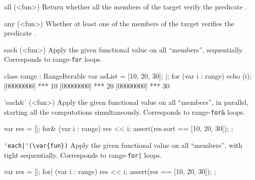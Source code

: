 \begin{urbiscriptapi}
\item[all](<fun>)
  Return whether all the members of the target verify the predicate
  .


\item[any](<fun>)
  Whether at least one of the members of the target verifies the
  predicate .


\item[each](<fun>)%
  Apply the given functional value  on all ``members'',
  sequentially.  Corresponds to range-\lstinline|for| loops.
\begin{urbiscript}[firstnumber=1]
class range : RangeIterable
{
  var asList = [10, 20, 30];
}|;
for (var i : range)
  echo (i);
[00000000] *** 10
[00000000] *** 20
[00000000] *** 30
\end{urbiscript}

\item['each&'](<fun>)%
  Apply the given functional value  on all ``members'', in
  parallel, starting all the computations simultaneously.  Corresponds
  to range-\lstinline|for&| loops.
\begin{urbiscript}
{
  var res = [];
  for& (var i : range)
    res << i;
  assert(res.sort == [10, 20, 30]);
};
\end{urbiscript}

\item \lstinline+'each|'(\var{fun})+%
  Apply the given functional value  on all ``members'', with
  tight sequentially.  Corresponds to range-\lstinline'for|' loops.
\begin{urbiscript}
{
  var res = [];
  for| (var i : range)
    res << i;
  assert(res == [10, 20, 30]);
};
\end{urbiscript}
\end{urbiscriptapi}

